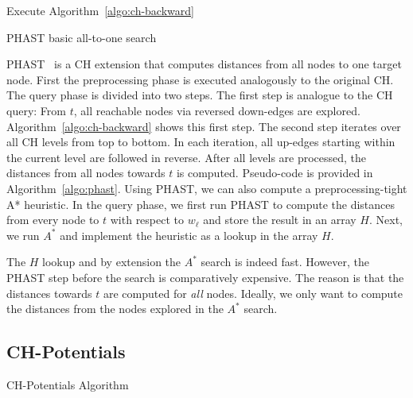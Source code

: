 \documentclass[letterpaper]{article} %
\begin{document}
\begin{algorithm2e}
Execute Algorithm~\ref{algo:ch-backward}\;
\caption{PHAST basic all-to-one search}
\label{algo:phast}
\end{algorithm2e}

PHAST~\cite{dgnw-phast-13} is a CH extension that computes distances from all nodes to one target node.
First the preprocessing phase is executed analogously to the original CH.
The query phase is divided into two steps.
The first step is analogue to the CH query:
From $t$, all reachable nodes via reversed down-edges are explored.
Algorithm~\ref{algo:ch-backward} shows this first step.
The second step iterates over all CH levels from top to bottom.
In each iteration, all up-edges starting within the current level are followed in reverse.
After all levels are processed, the distances from all nodes towards $t$ is computed.
Pseudo-code is provided in Algorithm~\ref{algo:phast}.
Using PHAST, we can also compute a preprocessing-tight A* heuristic.
In the query phase, we first run PHAST to compute the distances from every node to $t$ with respect to $w_\ell$ and store the result in an array $H$.
Next, we run $A^*$ and implement the heuristic as a lookup in the array $H$.

The $H$ lookup and by extension the $A^*$ search is indeed fast.
However, the PHAST step before the search is comparatively expensive.
The reason is that the distances towards $t$ are computed for \emph{all} nodes.
Ideally, we only want to compute the distances from the nodes explored in the $A^*$ search.

\subsection{CH-Potentials}

\begin{algorithm2e}
\caption{CH-Potentials Algorithm}
\label{algo:pot}
\end{algorithm2e}
\end{document}
